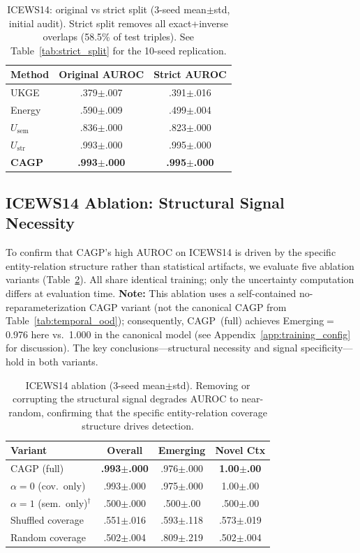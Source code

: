 \documentclass{article}
\begin{document}
\begin{table}[ht]
\centering
\caption{ICEWS14: original vs strict split (3-seed mean$\pm$std, initial audit). Strict split removes all exact+inverse overlaps (58.5\% of test triples). See Table~\ref{tab:strict_split} for the 10-seed replication.}
\label{tab:strict_split_appendix}
\small
\begin{tabular}{lcc}
\toprule
Method & Original AUROC & Strict AUROC \\
\midrule
UKGE & .379$\pm$.007 & .391$\pm$.016 \\
Energy & .590$\pm$.009 & .499$\pm$.004 \\
$U_{\text{sem}}$ & .836$\pm$.000 & .823$\pm$.000 \\
$U_{\text{str}}$ & .993$\pm$.000 & .995$\pm$.000 \\
\textbf{CAGP} & \textbf{.993$\pm$.000} & \textbf{.995$\pm$.000} \\
\bottomrule
\end{tabular}
\end{table}

\subsection{ICEWS14 Ablation: Structural Signal Necessity}
\label{app:icews14_ablation}

To confirm that CAGP's high AUROC on ICEWS14 is driven by the specific entity-relation structure rather than statistical artifacts, we evaluate five ablation variants (Table~\ref{tab:icews14_ablation}). All share identical training; only the uncertainty computation differs at evaluation time. \textbf{Note:} This ablation uses a self-contained no-reparameterization CAGP variant (not the canonical CAGP from Table~\ref{tab:temporal_ood}); consequently, CAGP~(full) achieves Emerging$=$0.976 here vs.\ 1.000 in the canonical model (see Appendix~\ref{app:training_config} for discussion). The key conclusions---structural necessity and signal specificity---hold in both variants.

\begin{table}[ht]
\centering
\caption{ICEWS14 ablation (3-seed mean$\pm$std). Removing or corrupting the structural signal degrades AUROC to near-random, confirming that the specific entity-relation coverage structure drives detection.}
\label{tab:icews14_ablation}
\small
\begin{tabular}{lccc}
\toprule
Variant & Overall & Emerging & Novel Ctx \\
\midrule
CAGP (full) & \textbf{.993$\pm$.000} & .976$\pm$.000 & \textbf{1.00$\pm$.00} \\
$\alpha{=}0$ (cov.\ only) & .993$\pm$.000 & .975$\pm$.000 & 1.00$\pm$.00 \\
$\alpha{=}1$ (sem.\ only)$^\dagger$ & .500$\pm$.000 & .500$\pm$.00 & .500$\pm$.00 \\
Shuffled coverage & .551$\pm$.016 & .593$\pm$.118 & .573$\pm$.019 \\
Random coverage & .502$\pm$.004 & .809$\pm$.219 & .502$\pm$.004 \\
\bottomrule
\end{tabular}
\end{table}
\end{document}
